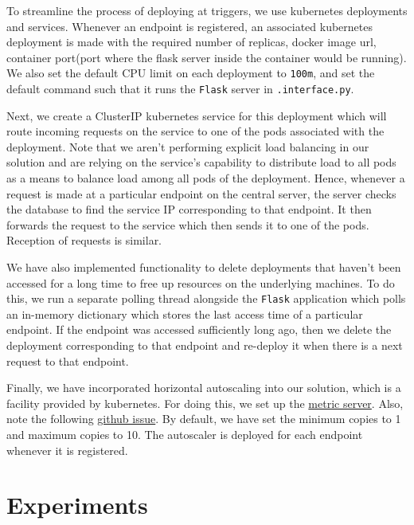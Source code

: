 \documentclass{article}
\begin{document}
To streamline the process of deploying at triggers, we use kubernetes deployments and services. Whenever an endpoint is registered, an associated kubernetes deployment is made with the required number of replicas, docker image url, container port(port where the flask server inside the container would be running). We also set the default CPU limit on each deployment to \texttt{100m}, and set the default command such that it runs the \texttt{Flask} server in \texttt{.interface.py}.

Next, we create a ClusterIP kubernetes service for this deployment which will route incoming requests on the service to one of the pods associated with the deployment. Note that we aren't performing explicit load balancing in our solution and are relying on the service's capability to distribute load to all pods as a means to balance load among all pods of the deployment. Hence, whenever a request is made at a particular endpoint on the central server, the server checks the database to find the service IP corresponding to that endpoint. It then forwards the request to the service which then sends it to one of the pods. Reception of requests is similar.

We have also implemented functionality to delete deployments that haven't been accessed for a long time to free up resources on the underlying machines. To do this, we run a separate polling thread alongside the \texttt{Flask} application which polls an in-memory dictionary which stores the last access time of a particular endpoint. If the endpoint was accessed sufficiently long ago, then we delete the deployment corresponding to that endpoint and re-deploy it when there is a next request to that endpoint.

Finally, we have incorporated horizontal autoscaling into our solution, which is a facility provided by kubernetes. For doing this, we set up the \href{https://github.com/kubernetes-sigs/metrics-server#deployment}{metric server}. Also, note the following \href{https://github.com/kubernetes-sigs/metrics-server/issues/525}{github issue}. By default, we have set the minimum copies to 1 and maximum copies to 10. The autoscaler is deployed for each endpoint whenever it is registered.

\section{Experiments}

\end{document}
